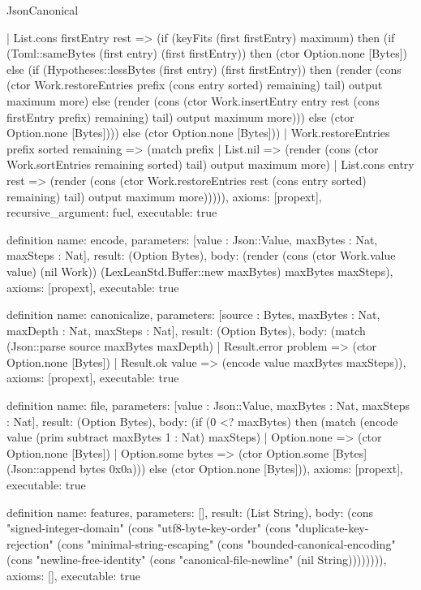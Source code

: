 \begin{lexlean}{JsonCanonical}
\begin{semanticmodule}
{     | List.cons firstEntry rest => (if (keyFits (first firstEntry) maximum) then (if (Toml::sameBytes (first entry) (first firstEntry)) then (ctor Option.none [Bytes]) else (if (Hypotheses::lessBytes (first entry) (first firstEntry)) then (render (cons (ctor Work.restoreEntries prefix (cons entry sorted) remaining) tail) output maximum more) else (render (cons (ctor Work.insertEntry entry rest (cons firstEntry prefix) remaining) tail) output maximum more))) else (ctor Option.none [Bytes]))) else (ctor Option.none [Bytes]))
   | Work.restoreEntries prefix sorted remaining => (match prefix
     | List.nil => (render (cons (ctor Work.sortEntries remaining sorted) tail) output maximum more)
     | List.cons entry rest => (render (cons (ctor Work.restoreEntries rest (cons entry sorted) remaining) tail) output maximum more))))),
  axioms: [propext],
  recursive_argument: fuel,
  executable: true
}

definition{
  name: encode,
  parameters: [value : Json::Value, maxBytes : Nat, maxSteps : Nat],
  result: (Option Bytes),
  body: (render (cons (ctor Work.value value) (nil Work)) (LexLeanStd.Buffer::new maxBytes) maxBytes maxSteps),
  axioms: [propext],
  executable: true
}

definition{
  name: canonicalize,
  parameters: [source : Bytes, maxBytes : Nat, maxDepth : Nat, maxSteps : Nat],
  result: (Option Bytes),
  body: (match (Json::parse source maxBytes maxDepth) | Result.error problem => (ctor Option.none [Bytes]) | Result.ok value => (encode value maxBytes maxSteps)),
  axioms: [propext],
  executable: true
}

definition{
  name: file,
  parameters: [value : Json::Value, maxBytes : Nat, maxSteps : Nat],
  result: (Option Bytes),
  body: (if (0 <? maxBytes) then (match (encode value (prim subtract maxBytes 1 : Nat) maxSteps) | Option.none => (ctor Option.none [Bytes]) | Option.some bytes => (ctor Option.some [Bytes] (Json::append bytes 0x0a))) else (ctor Option.none [Bytes])),
  axioms: [propext],
  executable: true
}

definition{
  name: features,
  parameters: [],
  result: (List String),
  body: (cons "signed-integer-domain" (cons "utf8-byte-key-order" (cons "duplicate-key-rejection" (cons "minimal-string-escaping" (cons "bounded-canonical-encoding" (cons "newline-free-identity" (cons "canonical-file-newline" (nil String)))))))),
  axioms: [],
  executable: true
}

\end{semanticmodule}
\end{lexlean}
